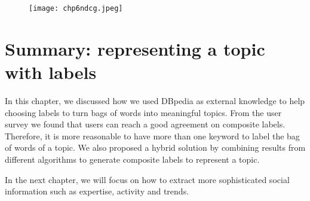 
\begin{figure}[htp]
\centering
\texttt{[image: chp6ndcg.jpeg]}  
\caption{}
\label{fig:chp6ndcg} 
\end{figure}




\section{Summary: representing a topic with labels}
In this chapter, we discussed how we used DBpedia as external knowledge to help choosing labels to turn bags of words into meaningful topics. From the user survey we found that users can reach a good agreement on composite labels. Therefore, it is more reasonable to have more than one keyword to label the bag of words of a topic. We also proposed a hybrid solution by combining results from different algorithms to generate composite labels to represent a topic. 

In the next chapter, we will focus on how to extract more sophisticated social information such as expertise, activity and trends.
